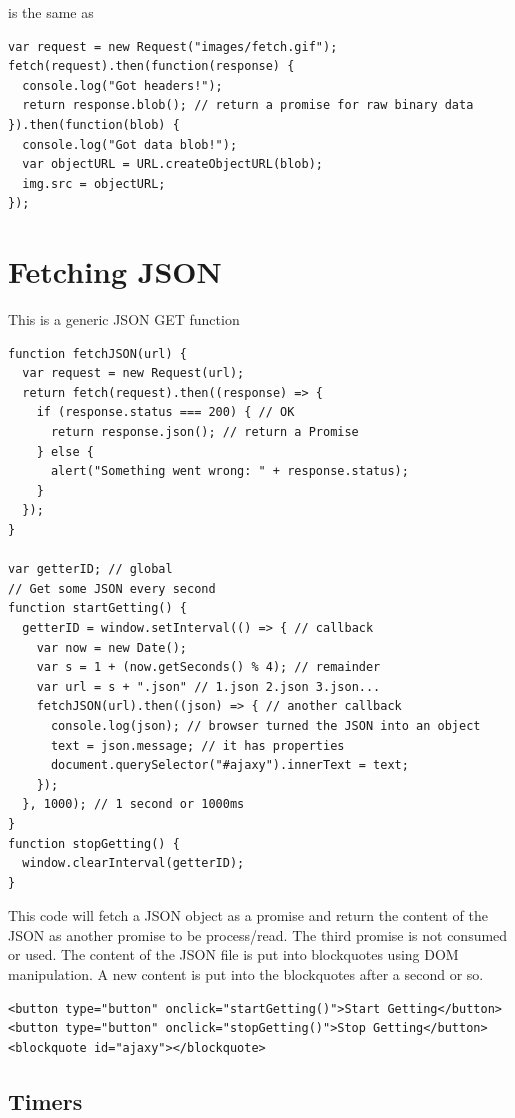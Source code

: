 \documentclass[../CMPUT-404-Notes.tex]{subfiles}
\begin{document}
is the same as 

\begin{verbatim}
var request = new Request("images/fetch.gif");
fetch(request).then(function(response) {
  console.log("Got headers!");
  return response.blob(); // return a promise for raw binary data
}).then(function(blob) {
  console.log("Got data blob!");
  var objectURL = URL.createObjectURL(blob);
  img.src = objectURL;
});
\end{verbatim}


\section{Fetching JSON}
This is a generic JSON GET function
\begin{verbatim}
function fetchJSON(url) {
  var request = new Request(url);
  return fetch(request).then((response) => {
    if (response.status === 200) { // OK
      return response.json(); // return a Promise
    } else {
      alert("Something went wrong: " + response.status);
    }
  });
}

var getterID; // global
// Get some JSON every second
function startGetting() {
  getterID = window.setInterval(() => { // callback
    var now = new Date();
    var s = 1 + (now.getSeconds() % 4); // remainder
    var url = s + ".json" // 1.json 2.json 3.json...
    fetchJSON(url).then((json) => { // another callback
      console.log(json); // browser turned the JSON into an object
      text = json.message; // it has properties
      document.querySelector("#ajaxy").innerText = text;
    });
  }, 1000); // 1 second or 1000ms
}
function stopGetting() {
  window.clearInterval(getterID);
}
\end{verbatim}

This code will fetch a JSON object as a promise and return the content of the JSON as another promise to be process/read. The third promise is not consumed or used. 
The content of the JSON file is put into blockquotes using DOM manipulation.
A new content is put into the blockquotes after a second or so.

\begin{verbatim}
<button type="button" onclick="startGetting()">Start Getting</button>
<button type="button" onclick="stopGetting()">Stop Getting</button>
<blockquote id="ajaxy"></blockquote>
\end{verbatim}

\subsection{Timers}
\end{document}
